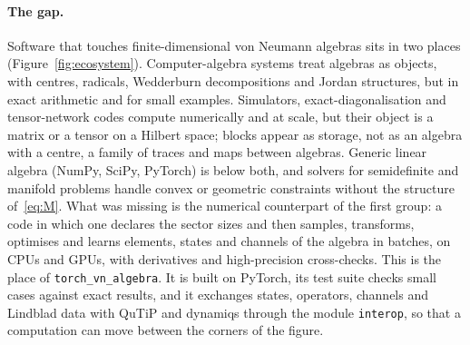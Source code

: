 \documentclass[11pt]{article}
\begin{document}
\paragraph{The gap.} Software that touches finite-dimensional von Neumann algebras sits in two places
(Figure~\ref{fig:ecosystem}). Computer-algebra systems treat algebras as objects, with centres, radicals, Wedderburn
decompositions and Jordan structures, but in exact arithmetic and for small examples. Simulators, exact-diagonalisation
and tensor-network codes compute numerically and at scale, but their object is a matrix or a tensor on a Hilbert space;
blocks appear as storage, not as an algebra with a centre, a family of traces and maps between algebras. Generic linear
algebra (NumPy, SciPy, PyTorch) is below both, and solvers for semidefinite and manifold problems handle convex or
geometric constraints without the structure of~\eqref{eq:M}. What was missing is the numerical counterpart of the first
group: a code in which one declares the sector sizes and then samples, transforms, optimises and learns elements,
states and channels of the algebra in batches, on CPUs and GPUs, with derivatives and high-precision cross-checks. This is the
place of \texttt{torch\_vn\_algebra}. It is built on PyTorch, its test suite checks small cases against exact
results, and it exchanges states, operators, channels and Lindblad data with QuTiP and dynamiqs through the module
\texttt{interop}, so that a computation can move between the corners of the figure.
\end{document}
